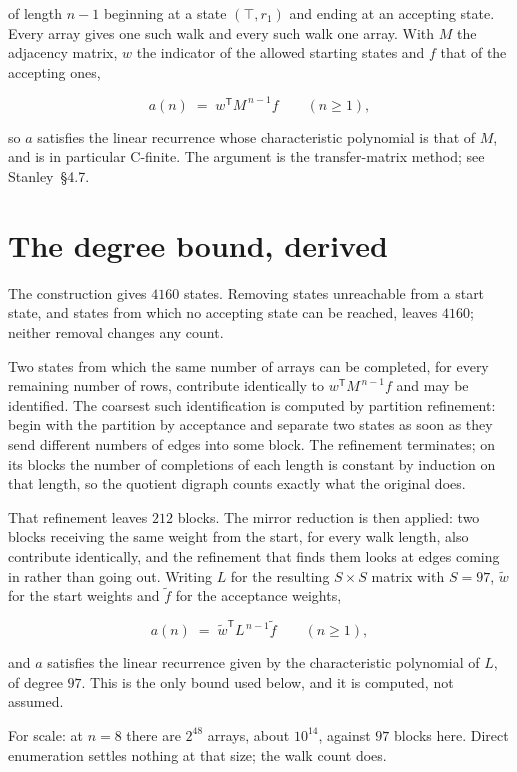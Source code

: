 \documentclass[11pt]{article}
\theoremstyle{definition}
\begin{document}
of length $n-1$ beginning at a state $(\top,r_1)$ and ending at an accepting state. Every array gives one such walk and every such walk one array. With $M$ the adjacency matrix, $w$ the indicator of the allowed starting states and $f$ that of the accepting ones,

\[a(n) \;=\; w^{\mathsf T} M^{\,n-1} f \qquad (n \ge 1),\]

so $a$ satisfies the linear recurrence whose characteristic polynomial is that of $M$, and is in particular C-finite. The argument is the transfer-matrix method; see Stanley~\S4.7.

\section{The degree bound, derived}

The construction gives $4160$ states. Removing states unreachable from a start state, and states from which no accepting state can be reached, leaves $4160$; neither removal changes any count.

Two states from which the same number of arrays can be completed, for every remaining number of rows, contribute identically to $w^{\mathsf T}M^{\,n-1}f$ and may be identified. The coarsest such identification is computed by partition refinement: begin with the partition by acceptance and separate two states as soon as they send different numbers of edges into some block. The refinement terminates; on its blocks the number of completions of each length is constant by induction on that length, so the quotient digraph counts exactly what the original does.

That refinement leaves $212$ blocks. The mirror reduction is then applied: two blocks receiving the same weight from the start, for every walk length, also contribute identically, and the refinement that finds them looks at edges coming in rather than going out. Writing $L$ for the resulting $S \times S$ matrix with $S = 97$, $\tilde w$ for the start weights and $\tilde f$ for the acceptance weights,

\[a(n) \;=\; \tilde w^{\mathsf T} L^{\,n-1} \tilde f \qquad (n \ge 1),\]

and $a$ satisfies the linear recurrence given by the characteristic polynomial of $L$, of degree $97$. This is the only bound used below, and it is computed, not assumed.

For scale: at $n = 8$ there are $2^{48}$ arrays, about $10^{14}$, against $97$ blocks here. Direct enumeration settles nothing at that size; the walk count does.
\end{document}
